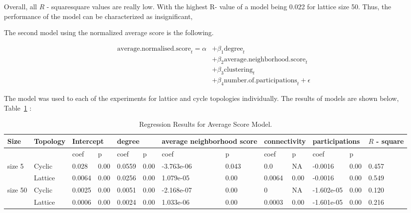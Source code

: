 Overall, all \(R\) - squaresquare values  are really low. With the highest R- value of a
model being 0.022 for lattice size 50. Thus, the performance of the model can
be characterized as insignificant,

The second model using the normalized average score is the following.

\begin{align}
\mathrm{average.normalised.score}_{t} = \alpha
    &+ \beta_{1}  \mathrm{degree}_{t} \\
    &+ \beta_{2}  \mathrm{average.neighborhood.score}_{t}    \\
    &+ \beta_{3}  \mathrm{clustering}_{t} \\
    &+ \beta_{4}  \mathrm{number.of.participations}_{t} + \epsilon
\end{align}

The model was used to each of the experiments for lattice and cycle topologies
individually. The results of models are shown below, Table~\ref{regression-average} :

\begin{table}[H]
\centering
\begin{adjustbox}{width=1\textwidth}
\small
\begin{tabular}{@{}|l|l|l|l|l|l|l|l|l|l|l|l|l|@{}}
\toprule
Size & Topology & \multicolumn{2}{l|}{Intercept} & \multicolumn{2}{l|}{degree} & \multicolumn{2}{l|}{average neighborhood score} & \multicolumn{2}{l|}{connectivity} & \multicolumn{2}{l|}{participations} & \(R\) - square \\ \midrule
        &          & coef            & p            & coef          & p           & coef                      & p                    & coef             & p              & coef                & p             &          \\ \midrule
size 5  & Cyclic    & 0.028           & 0.00         & 0.0559        & 0.00        & -3.763e-06                & 0.043                & 0.0              & NA             & -0.0016             & 0.00          & 0.457    \\ \midrule
        & Lattice  & 0.0064          & 0.00         & 0.0256        & 0.00        & 1.079e-05                 & 0.00                 & 0.0064           & 0.00           & -0.0016             & 0.00          & 0.549    \\ \midrule
size 50 & Cyclic    & 0.0025          & 0.00         & 0.0051        & 0.00        & -2.168e-07                & 0.00                 & 0                & NA             & -1.602e-05          & 0.00          & 0.120    \\ \midrule
        & Lattice  & 0.0006          & 0.00         & 0.0024        & 0.00        & 1.033e-06                 & 0.00                 & 0.0003           & 0.00           & -1.601e-05          & 0.00          & 0.216    \\ \bottomrule
\end{tabular}
\end{adjustbox}
\caption{Regression Results for Average Score Model.}
\label{regression-average}
\end{table}

